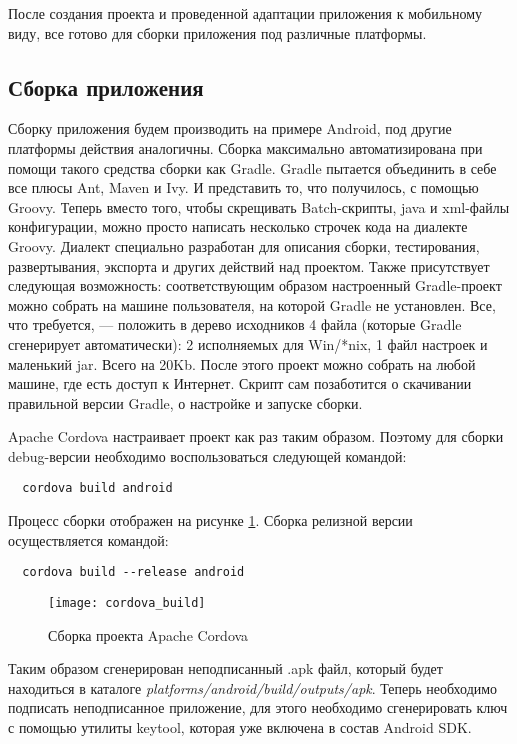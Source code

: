 После создания проекта и проведенной адаптации приложения к мобильному виду, все готово для сборки приложения под различные платформы.

\subsection{Сборка приложения}

Сборку приложения будем производить на примере Android, под другие платформы действия аналогичны. Сборка максимально автоматизирована при помощи такого средства сборки как Gradle. Gradle пытается объединить в себе все плюсы Ant, Maven и Ivy. И представить то, что получилось, с помощью Groovy. Теперь вместо того, чтобы скрещивать Batch-скрипты, java и xml-файлы конфигурации, можно просто написать несколько строчек кода на диалекте Groovy. Диалект специально разработан для описания сборки, тестирования, развертывания, экспорта и других действий над проектом. Также присутствует следующая возможность: соответствующим образом настроенный Gradle-проект можно собрать на машине пользователя, на которой Gradle не установлен. Все, что требуется, --- положить в дерево исходников 4 файла (которые Gradle сгенерирует автоматически): 2 исполняемых для Win/*nix, 1 файл настроек и маленький jar. Всего на 20Kb. После этого проект можно собрать на любой машине, где есть доступ к Интернет. Скрипт сам позаботится о скачивании правильной версии Gradle, о настройке и запуске сборки\cite{android:publish}.

Apache Cordova настраивает проект как раз таким образом. Поэтому для сборки debug-версии необходимо воспользоваться следующей командой:
\begin{lstlisting}
  cordova build android
\end{lstlisting}
Процесс сборки отображен на рисунке \ref{cordova_build}. Сборка релизной версии осуществляется командой:
\begin{lstlisting}
  cordova build --release android
\end{lstlisting}
\begin{figure}[ht]
\center\texttt{[image: cordova\_build]}
\caption{Сборка проекта Apache Cordova}\label{cordova_build}
\end{figure}

Таким образом сгенерирован неподписанный .apk файл, который будет находиться в каталоге \textit{platforms/android/build/outputs/apk}. Теперь необходимо подписать неподписанное приложение, для этого необходимо сгенерировать ключ с помощью утилиты keytool, которая уже включена в состав Android SDK.

